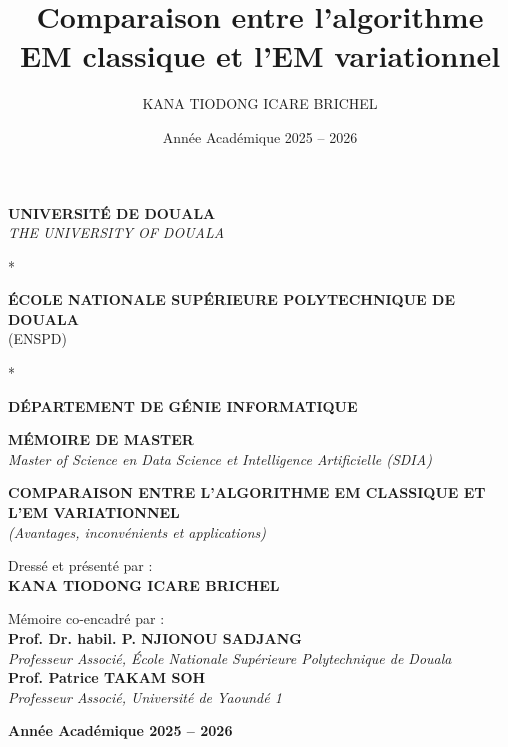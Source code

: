 \documentclass[12pt,a4paper,oneside]{report}
\title{Comparaison entre l'algorithme EM classique et l'EM variationnel}
\author{KANA TIODONG ICARE BRICHEL}
\date{Année Académique 2025 -- 2026}
\theoremstyle{plain}
\theoremstyle{definition}
\numberwithin{equation}{chapter}
\begin{document}
\addto\captionsfrench{%
  \renewcommand{\tablename}{Tableau}%
  \renewcommand{\figurename}{Figure}%
  \renewcommand{\contentsname}{Table des matières}%
  \renewcommand{\listtablename}{Liste des tableaux}%
  \renewcommand{\listfigurename}{Liste des figures}%
  \renewcommand{\bibname}{Bibliographie}%
  \renewcommand{\partname}{Partie}%
}
\captionsfrench

\begin{titlepage}
\begin{center}

\textbf{UNIVERSITÉ DE DOUALA}\\[2pt]
\textit{THE UNIVERSITY OF DOUALA}

\vspace{4pt}
* \quad * \quad *
\vspace{4pt}

\textbf{ÉCOLE NATIONALE SUPÉRIEURE POLYTECHNIQUE DE DOUALA}\\[2pt]
(ENSPD)

\vspace{4pt}
* \quad * \quad *
\vspace{20pt}

\textbf{DÉPARTEMENT DE GÉNIE INFORMATIQUE}

\vspace{10pt}
\textbf{\Large MÉMOIRE DE MASTER}\\[2pt]
\textit{Master of Science en Data Science et Intelligence Artificielle (SDIA)}

\vspace{30pt}
{\Large\textbf{COMPARAISON ENTRE L'ALGORITHME EM CLASSIQUE ET L'EM VARIATIONNEL}}\\[6pt]
\textit{(Avantages, inconvénients et applications)}

\vspace{40pt}
Dressé et présenté par :\\[4pt]
\textbf{\Large KANA TIODONG ICARE BRICHEL}

\vspace{25pt}
Mémoire co-encadré par :\\[8pt]
\textbf{Prof. Dr. habil. P. NJIONOU SADJANG}\\
\textit{Professeur Associé, École Nationale Supérieure Polytechnique de Douala}\\[8pt]
\textbf{Prof. Patrice TAKAM SOH}\\
\textit{Professeur Associé, Université de Yaoundé 1}

\vfill
\textbf{Année Académique 2025 -- 2026}

\end{center}
\end{titlepage}
\end{document}
